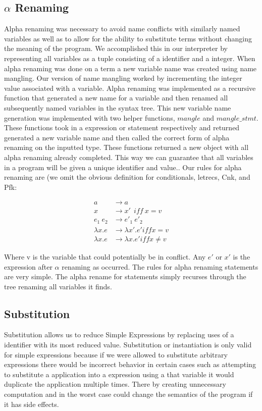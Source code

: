 \documentclass[preprint, 10pt]{sigplanconf}
\begin{document}
\subsection{$\alpha$ Renaming}
Alpha renaming was necessary to avoid name conflicts with similarly named variables as well as to allow for the ability to substitute terms without changing the meaning of the program. We accomplished this in our interpreter by representing all variables as a tuple consisting of a identifier and a integer. When alpha renaming was done on a term a new variable name was created using name mangling. Our version of name mangling worked by incrementing the integer value associated with a variable. Alpha renaming was implemented as a recursive function that generated a new name for a variable and then renamed all subsequently named variables in the syntax tree. This new variable name generation was implemented with two helper functions, $mangle$ and $mangle\_stmt$. These functions took in a expression or statement respectively and returned generated a new variable name and then called the correct form of alpha renaming on the inputted type. These functions returned a new object with all alpha renaming already completed.  This way we can guarantee that all variables in a program will be given a unique identifier and value.. Our rules for alpha renaming are (we omit the obvious definition for conditionals, letrecs, Cnk, and Pfk: 

\begin{align}
a &\rightarrow a \\
x &\rightarrow x'\ \ iff\ x = v\\
e_{1}\ e_{2} &\rightarrow e'_{1}\ e'_{2}\\
\lambda x.e &\rightarrow  \lambda x'.e' iff x = v\\
\lambda x.e &\rightarrow  \lambda x.e' iff x \neq v
\end{align}

Where v is the variable that could potentially be in conflict. Any $e'$ or $x'$ is the expression after $\alpha$ renaming as occurred. The rules for alpha renaming statements are very simple. The alpha rename for statements simply recurses through the tree renaming all variables it finds. 

\subsection{Substitution}
Substitution allows us to reduce Simple Expressions by replacing uses of a identifier with its most reduced value. Substitution or instantiation is only valid for simple expressions because if we were allowed to substitute arbitrary expressions there would be incorrect behavior in certain cases such as attempting to substitute a application into a expression using a that variable it would duplicate the application multiple times. There by creating unnecessary computation and in the worst case could change the semantics of the program if it has side effects. 
\end{document}
